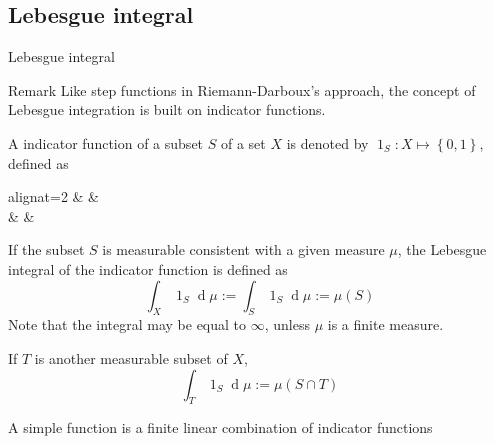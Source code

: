\documentclass[utf-8, 10pt, aspectratio=1610]{beamer}
\newcommand{\eqmath}[3][c]{%
  \eqmakebox[#2][#1]{$\displaystyle#3$}%
}
\newcommand{\eqtext}[3][c]{%
  \eqmakebox[#2][#1]{#3}%
}
\begin{document}
\subsection{Lebesgue integral}
\begin{frame}[allowframebreaks]{Lebesgue integral}
	\vspace*{\fill}
	\begin{block}{Remark}
		Like step functions in Riemann-Darboux's approach, the concept of Lebesgue integration is built on indicator functions.
	\end{block}
	\vspace*{\fill}
	\begin{definition}
		A indicator function of a subset \(S\) of a set \(X\) is denoted by \(\operatorname{1}_S: X \mapsto \left\{0,1\right\}\), defined as
		\begin{empheq}[left={\eqmath[r]{A}{\operatorname{1}_S(x):=}\empheqlbrace}]{alignat=2}
			&\eqmath[l]{B}{1,} & \eqtext[l]{C}{\(x\in S\)} \\
			&\eqmath[l]{B}{0,} & \eqtext[l]{C}{\(x\notin S\)}
		\end{empheq}
	\end{definition}
	\vspace*{\fill}
	\framebreak
	\vspace*{\fill}
	\begin{definition}
		If the subset \(S\) is measurable consistent with a given measure \(\mu\), the Lebesgue integral of the indicator function is defined as
		\begin{equation}
			\int_{X}^{} \operatorname{1}_S \operatorname{d}\!\mu := \int_{S}^{} \operatorname{1}_S \operatorname{d}\!\mu := \mu \left(S\right)
		\end{equation}
		Note that the integral may be equal to \(\infty\), unless \(\mu\) is a finite measure.
		\par If \(T\) is another measurable subset of \(X\),
		\begin{equation}
			\int_{T}^{} \operatorname{1}_S \operatorname{d}\!\mu := \mu \left(S \cap T\right)
		\end{equation}
	\end{definition}
	\vspace*{\fill}
	\framebreak
	\vspace*{\fill}
	\begin{definition}
		A simple function is a finite linear combination of indicator functions
		\begin{equation}

\end{equation}
\end{definition}
\end{frame}
\end{document}
